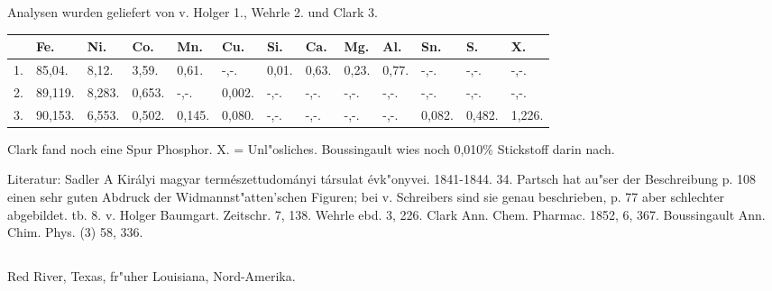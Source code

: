 \documentclass[a4paper, 11pt, oneside]{article}
\begin{document}
Analysen wurden geliefert von v. Holger 1., Wehrle 2. und Clark 3.
\begin{table}[H]
    \centering\swabfamily\Large
    \normalsize
    \begin{tabular}{p{3mm} p{8mm} p{7mm} p{6mm} p{6mm} p{6mm} p{5mm} p{5mm} p{5mm} p{5mm} p{5mm} p{5mm} p{5mm}}
         & Fe. & Ni. & Co. & Mn. & Cu. & Si. & Ca. & Mg. & Al. & Sn. & S. & X. \\ \hline
        1. & 85,04. & 8,12. & 3,59. & 0,61. & -,-. & 0,01. & 0,63. & 0,23. & 0,77. & -,-. & -,-. & -,-. \\
        2. & 89,119. & 8,283. & 0,653. & -,-. & 0,002. & -,-. & -,-. & -,-. & -,-. & -,-. & -,-. & -,-. \\
        3. & 90,153. & 6,553. & 0,502. & 0,145. & 0,080. & -,-. & -,-. & -,-. & -,-. & 0,082. & 0,482. & 1,226. \\
    \end{tabular}
\end{table}

Clark fand noch eine Spur Phosphor. X. = Unl"osliches. Boussingault wies noch 0,010\% Stickstoff darin nach.

\normalsize
Literatur: Sadler A Királyi magyar természettudományi társulat évk"onyvei. 1841-1844. 34. Partsch hat au"ser der Beschreibung p. 108 einen sehr guten Abdruck der Widmannst"atten'schen Figuren; bei v. Schreibers sind sie genau beschrieben, p. 77 aber schlechter abgebildet. tb. 8. v. Holger Baumgart. Zeitschr. 7, 138. Wehrle ebd. 3, 226. Clark Ann. Chem. Pharmac. 1852, 6, 367. Boussingault Ann. Chim. Phys. (3) 58, 336.

\subsection{}
\LARGE
\paragraph{}
Red River, Texas, fr"uher Louisiana, Nord-Amerika.
\end{document}
